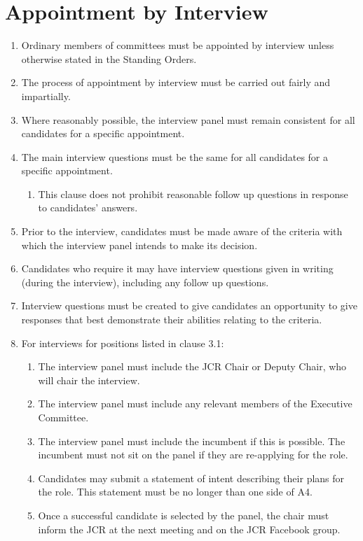 \documentclass[12pt]{article}  %
\begin{document}
\section{Appointment by Interview}
\begin{enumerate}
    \item Ordinary members of committees must be appointed by interview unless otherwise stated in the Standing Orders.
    \item The process of appointment by interview must be carried out fairly and impartially.
    \item Where reasonably possible, the interview panel must remain consistent for all candidates for a specific appointment.
    \item The main interview questions must be the same for all candidates for a specific appointment.
    \begin{enumerate}
        \item This clause does not prohibit reasonable follow up questions in response to candidates’ answers.
    \end{enumerate}
    \item Prior to the interview, candidates must be made aware of the criteria with which the interview panel intends to make its decision.
    \item Candidates who require it may have interview questions given in writing (during the interview), including any follow up questions.
    \item Interview questions must be created to give candidates an opportunity to give responses that best demonstrate their abilities relating to the criteria.
    \item For interviews for positions listed in clause 3.1:
    \begin{enumerate}
        \item The interview panel must include the JCR Chair or Deputy Chair, who will chair the interview.
        \item The interview panel must include any relevant members of the Executive Committee.
        \item The interview panel must include the incumbent if this is possible. The incumbent must not sit on the panel if they are re-applying for the role.
        \item Candidates may submit a statement of intent describing their plans for the role. This statement must be no longer than one side of A4.
        \item Once a successful candidate is selected by the panel, the chair must inform the JCR at the next meeting and on the JCR Facebook group.

\end{enumerate}
\end{enumerate}
\end{document}
